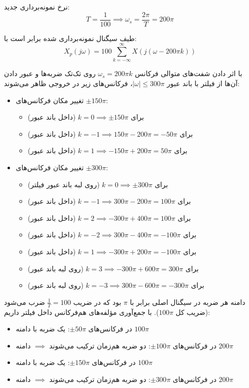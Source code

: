 { نرخ نمونه‌برداری جدید:}
\begin{equation*}
T = \frac{1}{100} \implies \omega_s = \frac{2\pi}{T} = 200\pi
\end{equation*}

طیف سیگنال نمونه‌برداری شده برابر است با:
\begin{equation*}
X_p(j\omega) = 100 \sum_{k=-\infty}^{\infty} X(j(\omega - 200\pi k))
\end{equation*}

با اثر دادن شفت‌های متوالی فرکانس $\omega_s = 200\pi k$ روی تک‌تک ضربه‌ها و عبور دادن آن‌ها از فیلتر با باند عبور $|\omega| \le 300\pi$، فرکانس‌های زیر در خروجی ظاهر می‌شوند:
\begin{itemize}
    \item {تغییر مکان فرکانس‌های $\pm 150\pi$:}
    \begin{itemize}
        \item برای $k=0 \implies \pm 150\pi$ (داخل باند عبور)
        \item برای $k=-1 \implies 150\pi - 200\pi = -50\pi$ (داخل باند عبور)
        \item برای $k=1 \implies -150\pi + 200\pi = 50\pi$ (داخل باند عبور)
    \end{itemize}
    \item {تغییر مکان فرکانس‌های $\pm 300\pi$:}
    \begin{itemize}
        \item برای $k=0 \implies \pm 300\pi$ (روی لبه باند عبور فیلتر)
        \item برای $k=-1 \implies 300\pi - 200\pi = 100\pi$ (داخل باند عبور)
        \item برای $k=2 \implies -300\pi + 400\pi = 100\pi$ (داخل باند عبور)
        \item برای $k=-2 \implies 300\pi - 400\pi = -100\pi$ (داخل باند عبور)
        \item برای $k=1 \implies -300\pi + 200\pi = -100\pi$ (داخل باند عبور)
        \item برای $k=3 \implies -300\pi + 600\pi = 300\pi$ (روی لبه باند عبور)
        \item برای $k=-3 \implies 300\pi - 600\pi = -300\pi$ (روی لبه باند عبور)
    \end{itemize}
\end{itemize}

دامنه هر ضربه در سیگنال اصلی برابر با $\pi$ بود که در ضریب $\frac{1}{T}=100$ ضرب می‌شود (ضریب کل $100\pi$). با جمع‌آوری مؤلفه‌های هم‌فرکانس داخل فیلتر داریم:
\begin{itemize}
    \item در فرکانس‌های $\pm 50\pi$: یک ضربه با دامنه $100\pi$
    \item در فرکانس‌های $\pm 100\pi$: دو ضربه هم‌زمان ترکیب می‌شوند $\implies$ دامنه $200\pi$
    \item در فرکانس‌های $\pm 150\pi$: یک ضربه با دامنه $100\pi$
    \item در فرکانس‌های $\pm 300\pi$: دو ضربه هم‌زمان ترکیب می‌شوند $\implies$ دامنه $200\pi$
\end{itemize}


